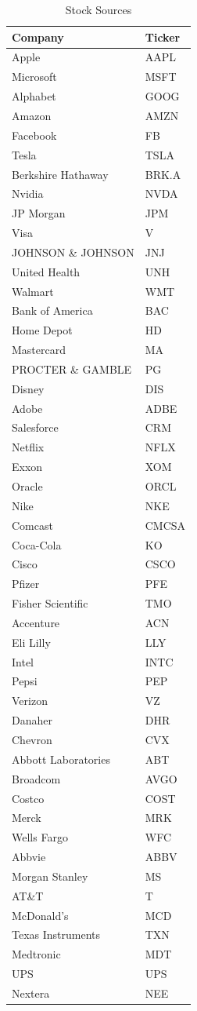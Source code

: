 \documentclass[conference]{IEEEtran}
\begin{document}
\begin{table}[ht]
    \caption{Stock Sources}
    \centering
\begin{tabular}{|l|l|}
	\hline
	\textbf{Company} & \textbf{Ticker} \\
	\hline
	Apple & AAPL \\
	Microsoft & MSFT \\
	Alphabet & GOOG \\
	Amazon & AMZN \\
	Facebook & FB \\
	Tesla & TSLA \\
	Berkshire Hathaway & BRK.A \\
	Nvidia & NVDA \\
	JP Morgan & JPM \\
	Visa & V \\
	JOHNSON \& JOHNSON & JNJ \\
	United Health & UNH \\
	Walmart & WMT \\
	Bank of America & BAC \\
	Home Depot & HD \\
	Mastercard & MA \\
	PROCTER \& GAMBLE & PG \\
	Disney & DIS \\
	Adobe & ADBE \\
	Salesforce & CRM \\
	Netflix & NFLX \\
	Exxon & XOM \\
	Oracle & ORCL \\
	Nike & NKE \\
	Comcast & CMCSA \\
	Coca-Cola & KO \\
	Cisco & CSCO \\
	Pfizer & PFE \\
	Fisher Scientific & TMO \\
	Accenture & ACN \\
	Eli Lilly & LLY \\
	Intel & INTC \\
	Pepsi & PEP \\
	Verizon & VZ \\
	Danaher & DHR \\
	Chevron & CVX \\
	Abbott Laboratories & ABT \\
	Broadcom & AVGO \\
	Costco & COST \\
	Merck & MRK \\
	Wells Fargo & WFC \\
	Abbvie & ABBV \\
	Morgan Stanley & MS \\
	AT\&T & T \\
	McDonald's & MCD \\
	Texas Instruments & TXN \\
	Medtronic & MDT \\
	UPS & UPS \\
	Nextera & NEE \\
	\hline
\end{tabular}
\label{table:stockSources}
\end{table}
\end{document}
